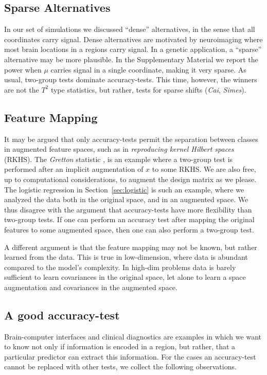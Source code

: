 \documentclass[oupdraft]{bio}
\begin{document}
\subsection{Sparse Alternatives}
\label{sec:sparse}
In our set of simulations we discussed ``dense'' alternatives, in the sense that all coordinates carry signal.
Dense alternatives are motivated by neuroimaging where most brain locations in a regions carry signal.
In a genetic application, a ``sparse'' alternative may be more plausible. 
In the Supplementary Material we report the power when $\mu$ carries signal in a single coordinate, making it very sparse. 
As usual, two-group tests dominate accuracy-tests.
This time, however, the winners are not the $T^2$ type statistics, but rather, tests for sparse shifts (\emph{Cai}, \emph{Simes}).





\subsection{Feature Mapping}
It may be argued that only accuracy-tests permit the separation between classes in augmented feature spaces, such as in \emph{reproducing kernel Hilbert spaces} (RKHS).
The \emph{Gretton} statistic \citep{gretton_kernel_2012-1}, is an example where a two-group test is performed after an implicit augmentation of $x$ to some RKHS.
We are also free, up to computational considerations, to augment the design matrix as we please. 
The logistic regression in Section~\ref{sec:logistic} is such an example, where we analyzed the data both in the original space, and in an augmented space. 
We thus disagree with the argument that accuracy-tests have more flexibility than two-group tests. 
If one can perform an accuracy test after mapping the original features to some augmented space, then one can also perform a two-group test. 


A different argument is that the feature mapping may not be known, but rather learned from the data. 
This is true in low-dimension, where data is abundant compared to the model's complexity.
In high-dim problems data is barely sufficient to learn covariances in the original space, let alone to learn a space augmentation and covariances in the augmented space.  






\subsection{A good accuracy-test}
Brain-computer interfaces and clinical diagnostics \citep{olivetti_induction_2012,wager_fmri-based_2013} are examples in which we want to know not only if information is encoded in a region, but rather, that a particular predictor can extract this information. 
For the cases an accuracy-test cannot be replaced with other tests, we collect the following observations.
\end{document}

